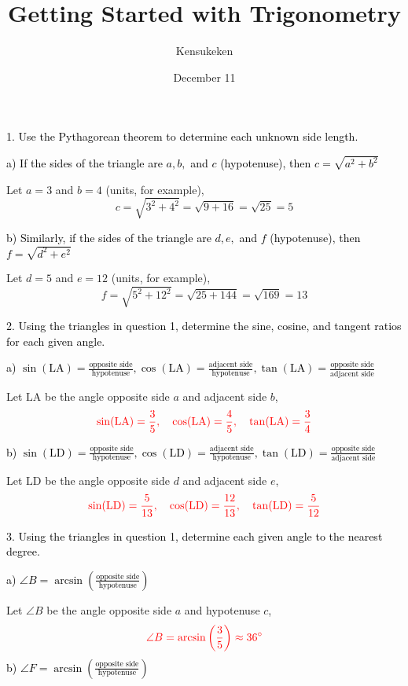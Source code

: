 \documentclass{article}
\begin{document}
\title{{Getting Started with Trigonometry}}
\date{December 11}
\author{{Kensukeken}}
\maketitle

\textcolor{black}{1. Use the Pythagorean theorem to determine each unknown side length.}

\textcolor{black}{a) If the sides of the triangle are $a, b,$ and $c$ (hypotenuse), then $c = \sqrt{a^2 + b^2}$}

Let $a = 3$ and $b = 4$ (units, for example),
\[
c = \sqrt{3^2 + 4^2} = \sqrt{9 + 16} = \sqrt{25} = 5
\]

\textcolor{black}{b) Similarly, if the sides of the triangle are $d, e,$ and $f$ (hypotenuse), then $f = \sqrt{d^2 + e^2}$}

Let $d = 5$ and $e = 12$ (units, for example),
\[
f = \sqrt{5^2 + 12^2} = \sqrt{25 + 144} = \sqrt{169} = 13
\]

\textcolor{black}{2. Using the triangles in question 1, determine the sine, cosine, and tangent ratios for each given angle.}

\textcolor{black}{a) $\sin(\text{LA}) = \frac{\text{opposite side}}{\text{hypotenuse}}, \cos(\text{LA}) = \frac{\text{adjacent side}}{\text{hypotenuse}}, \tan(\text{LA}) = \frac{\text{opposite side}}{\text{adjacent side}}$}

Let $\text{LA}$ be the angle opposite side $a$ and adjacent side $b$,
\[
\textcolor{red}{\sin(\text{LA}) = \frac{3}{5}, \quad \cos(\text{LA}) = \frac{4}{5}, \quad \tan(\text{LA}) = \frac{3}{4}}
\]

\textcolor{black}{b) $\sin(\text{LD}) = \frac{\text{opposite side}}{\text{hypotenuse}}, \cos(\text{LD}) = \frac{\text{adjacent side}}{\text{hypotenuse}}, \tan(\text{LD}) = \frac{\text{opposite side}}{\text{adjacent side}}$}

Let $\text{LD}$ be the angle opposite side $d$ and adjacent side $e$,
\[
\textcolor{red}{\sin(\text{LD}) = \frac{5}{13}, \quad \cos(\text{LD}) = \frac{12}{13}, \quad \tan(\text{LD}) = \frac{5}{12}}
\]

\textcolor{black}{3. Using the triangles in question 1, determine each given angle to the nearest degree.}

\textcolor{black}{a) $\angle B = \arcsin\left(\frac{\text{opposite side}}{\text{hypotenuse}}\right)$}

Let $\angle B$ be the angle opposite side $a$ and hypotenuse $c$,
\[
\textcolor{red}{\angle B = \arcsin\left(\frac{3}{5}\right) \approx 36^\circ}
\]
\newpage
\textcolor{black}{b) $\angle F = \arcsin\left(\frac{\text{opposite side}}{\text{hypotenuse}}\right)$}
\end{document}
